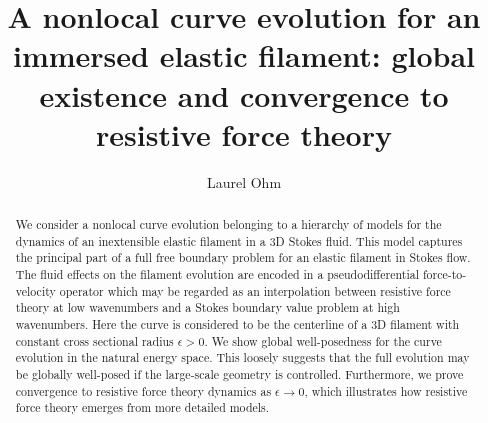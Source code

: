 \documentclass[11pt,reqno]{amsart}
\numberwithin{equation}{section}
\theoremstyle{definition}
\begin{document}
\title[A nonlocal curve evolution for an immersed elastic filament]{A nonlocal curve evolution for an immersed elastic filament: global existence and convergence to resistive force theory}


\author{Laurel Ohm}
\address{Department of Mathematics, University of Wisconsin - Madison, Madison, WI 53706}


\begin{abstract} 
We consider a nonlocal curve evolution belonging to a hierarchy of models for the dynamics of an inextensible elastic filament in a 3D Stokes fluid. This model captures the principal part of a full free boundary problem for an elastic filament in Stokes flow. The fluid effects on the filament evolution are encoded in a pseudodifferential force-to-velocity operator which may be regarded as an interpolation between resistive force theory at low wavenumbers and a Stokes boundary value problem at high wavenumbers. Here the curve is considered to be the centerline of a 3D filament with constant cross sectional radius $\epsilon>0$. We show global well-posedness for the curve evolution in the natural energy space. This loosely suggests that the full evolution may be globally well-posed if the large-scale geometry is controlled. Furthermore, we prove convergence to resistive force theory dynamics as $\epsilon\to 0$, which illustrates how resistive force theory emerges from more detailed models.
\end{abstract}

\maketitle

\tableofcontents

\setlength{\parskip}{4pt}
\end{document}
